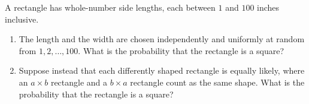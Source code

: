 A rectangle has whole-number side lengths, each between $1$ and $100$ inches inclusive.
\begin{enumerate}
\item[(a)] The length and the width are chosen independently and uniformly at random from $1,2,\dots,100$. What is the probability that the rectangle is a square?
\item[(b)] Suppose instead that each differently shaped rectangle is equally likely, where an $a\times b$ rectangle and a $b\times a$ rectangle count as the same shape. What is the probability that the rectangle is a square?
\end{enumerate}
